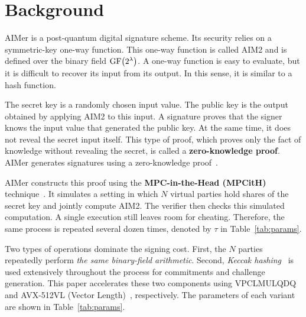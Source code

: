 \section{Background}
\label{sec:bg}

AIMer is a post-quantum digital signature scheme. Its security relies on a symmetric-key one-way function. This one-way function is called AIM2 and is defined over the binary field $\operatorname{GF}\bigl(2^{\lambda}\bigr)$. A one-way function is easy to evaluate, but it is difficult to recover its input from its output. In this sense, it is similar to a hash function.

The secret key is a randomly chosen input value. The public key is the output obtained by applying AIM2 to this input. A signature proves that the signer knows the input value that generated the public key. At the same time, it does not reveal the secret input itself. This type of proof, which proves only the fact of knowledge without revealing the secret, is called a \textbf{zero-knowledge proof}. AIMer generates signatures using a zero-knowledge proof~\cite{fiege1987zero}.

AIMer constructs this proof using the \textbf{MPC-in-the-Head (MPCitH)} technique~\cite{delpech2021limbo}. It simulates a setting in which $N$ virtual parties hold shares of the secret key and jointly compute AIM2. The verifier then checks this simulated computation. A single execution still leaves room for cheating. Therefore, the same process is repeated several dozen times, denoted by $\tau$ in Table~\ref{tab:params}.

Two types of operations dominate the signing cost. First, the $N$ parties repeatedly perform \emph{the same binary-field arithmetic}. Second, \emph{Keccak hashing}~\cite{bertoni2009keccak,bertoni2013keccak} is used extensively throughout the process for commitments and challenge generation. This paper accelerates these two components using VPCLMULQDQ and AVX-512VL (Vector Length)~\cite{anderson2018enhanced}, respectively. The parameters of each variant are shown in Table~\ref{tab:params}.

